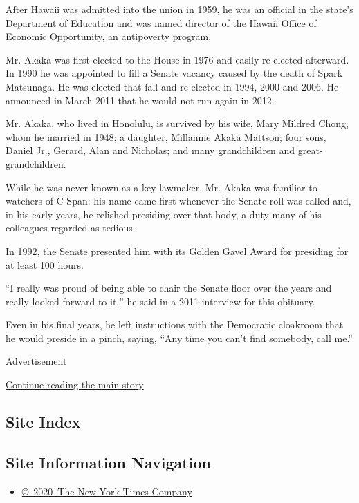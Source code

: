 After Hawaii was admitted into the union in 1959, he was an official in
the state's Department of Education and was named director of the Hawaii
Office of Economic Opportunity, an antipoverty program.

Mr. Akaka was first elected to the House in 1976 and easily re-elected
afterward. In 1990 he was appointed to fill a Senate vacancy caused by
the death of Spark Matsunaga. He was elected that fall and re-elected in
1994, 2000 and 2006. He announced in March 2011 that he would not run
again in 2012.

Mr. Akaka, who lived in Honolulu, is survived by his wife, Mary Mildred
Chong, whom he married in 1948; a daughter, Millannie Akaka Mattson;
four sons, Daniel Jr., Gerard, Alan and Nicholas; and many grandchildren
and great-grandchildren.

While he was never known as a key lawmaker, Mr. Akaka was familiar to
watchers of C-Span: his name came first whenever the Senate roll was
called and, in his early years, he relished presiding over that body, a
duty many of his colleagues regarded as tedious.

In 1992, the Senate presented him with its Golden Gavel Award for
presiding for at least 100 hours.

``I really was proud of being able to chair the Senate floor over the
years and really looked forward to it,'' he said in a 2011 interview for
this obituary.

Even in his final years, he left instructions with the Democratic
cloakroom that he would preside in a pinch, saying, ``Any time you can't
find somebody, call me.''

Advertisement

\protect\hyperlink{after-bottom}{Continue reading the main story}

\hypertarget{site-index}{%
\subsection{Site Index}\label{site-index}}

\hypertarget{site-information-navigation}{%
\subsection{Site Information
Navigation}\label{site-information-navigation}}

\begin{itemize}
\tightlist
\item
  \href{https://help.nytimes.com/hc/en-us/articles/115014792127-Copyright-notice}{©~2020~The
  New York Times Company}
\end{itemize}

